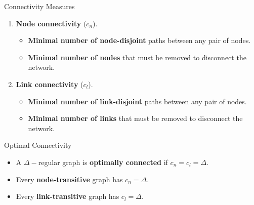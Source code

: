 \begin{frame}[t]{Connectivity Measures}
\begin{enumerate}
\item \textbf{Node connectivity} ($c_n$). 
\begin{itemize}
\item \textbf{Minimal number of node-disjoint} paths between any pair of nodes.
\item \textbf{Minimal number of nodes} that must be removed to disconnect the network.
\end{itemize}
\item \textbf{Link connectivity} ($c_l$). 
\begin{itemize}
\item \textbf{Minimal number of link-disjoint} paths between any pair of nodes.
\item \textbf{Minimal number of links} that must be removed to disconnect the network.
\end{itemize}
\end{enumerate}
\end{frame}
\begin{frame}[t]{Optimal Connectivity}

\begin{itemize}
\item A $\Delta-$regular graph is \textbf{optimally connected} if $c_n=c_l=\Delta$.
\item Every \textbf{node-transitive} graph has $c_n=\Delta$.
\item Every \textbf{link-transitive} graph has $c_l=\Delta$.
\end{itemize}
\end{frame}
